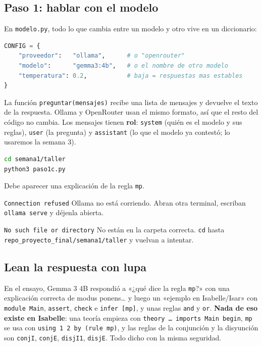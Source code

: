 \documentclass[11pt,a4paper]{article}
\newcommand{\cd}[1]{\texttt{\small #1}}
\begin{document}
\subsection{Paso 1: hablar con el modelo}
En \cd{modelo.py}, todo lo que cambia entre un modelo y otro vive en un
diccionario:
\begin{lstlisting}[language=Python]
CONFIG = {
    "proveedor":   "ollama",      # o "openrouter"
    "modelo":      "gemma3:4b",   # o el nombre de otro modelo
    "temperatura": 0.2,           # baja = respuestas mas estables
}
\end{lstlisting}
La función \cd{preguntar(mensajes)} recibe una lista de mensajes y
devuelve el texto de la respuesta. Ollama y OpenRouter usan el mismo
formato, así que el resto del código no cambia. Los mensajes tienen
\textbf{rol}: \cd{system} (quién es el modelo y sus reglas), \cd{user} (la
pregunta) y \cd{assistant} (lo que el modelo ya contestó; lo usaremos la
semana 3).

\begin{haga}
\begin{lstlisting}[language=bash]
cd semana1/taller
python3 paso1c.py
\end{lstlisting}
Debe aparecer una explicación de la regla \cd{mp}.
\end{haga}
\begin{falla}{\texttt{Connection refused}}
  Ollama no está corriendo. Abran otra terminal, escriban
  \cd{ollama serve} y déjenla abierta.
\end{falla}
\begin{falla}{\texttt{No such file or directory}}
  No están en la carpeta correcta. \cd{cd} hasta
  \cd{repo\_proyecto\_final/semana1/taller} y vuelvan a intentar.
\end{falla}

\subsection{Lean la respuesta con lupa}
En el ensayo, Gemma 3 4B respondió a «¿qué dice la regla \cd{mp}?» con
una explicación correcta de modus ponens\ldots{} y luego un «ejemplo en
Isabelle/Isar» con \cd{module Main}, \cd{assert}, \cd{check} e
\cd{infer [mp]}, y unas reglas \cd{and} y \cd{or}. \textbf{Nada de eso
existe en Isabelle}: una teoría empieza con \cd{theory \ldots{} imports
Main begin}, \cd{mp} se usa con \cd{using 1 2 by (rule mp)}, y las reglas
de la conjunción y la disyunción son \cd{conjI}, \cd{conjE},
\cd{disjI1}, \cd{disjE}. Todo dicho con la misma seguridad.
\end{document}
